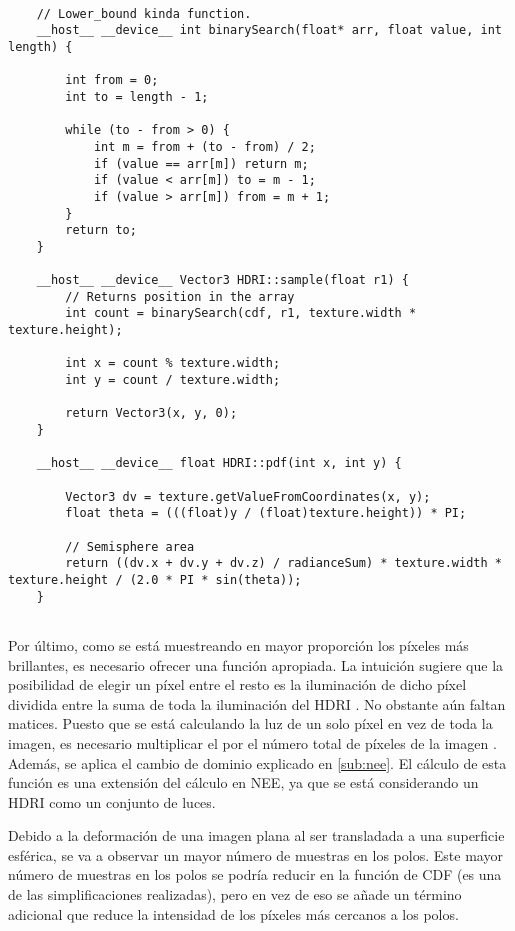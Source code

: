 \begin{lstlisting}
	
	// Lower_bound kinda function.
	__host__ __device__ int binarySearch(float* arr, float value, int length) {

		int from = 0;
		int to = length - 1;

		while (to - from > 0) {
			int m = from + (to - from) / 2;
			if (value == arr[m]) return m;
			if (value < arr[m])	to = m - 1;
			if (value > arr[m]) from = m + 1;
		}
		return to;
	}
	
	__host__ __device__ Vector3 HDRI::sample(float r1) {
		// Returns position in the array
		int count = binarySearch(cdf, r1, texture.width * texture.height);

		int x = count % texture.width;
		int y = count / texture.width;

		return Vector3(x, y, 0);
	}
	
	__host__ __device__ float HDRI::pdf(int x, int y) {

		Vector3 dv = texture.getValueFromCoordinates(x, y);
		float theta = (((float)y / (float)texture.height)) * PI;

		// Semisphere area
		return ((dv.x + dv.y + dv.z) / radianceSum) * texture.width * texture.height / (2.0 * PI * sin(theta));
	}
	
\end{lstlisting}

Por último, como se está muestreando en mayor proporción los píxeles más brillantes, es necesario ofrecer una función  apropiada. La intuición sugiere que la posibilidad de elegir un píxel entre el resto es la iluminación de dicho píxel dividida entre la suma de toda la iluminación del HDRI . No obstante aún faltan matices. Puesto que se está calculando la luz de un solo píxel en vez de toda la imagen, es necesario multiplicar el  por el número total de píxeles de la imagen . Además, se aplica el cambio de dominio explicado en \autoref{sub:nee}. El cálculo de esta función  es una extensión del cálculo en NEE, ya que se está considerando un HDRI como un conjunto de luces.

Debido a la deformación de una imagen plana al ser transladada a una superficie esférica, se va a observar un mayor número de muestras en los polos. Este mayor número de muestras en los polos se podría reducir en la función de CDF (es una de las simplificaciones realizadas), pero en vez de eso se añade un término adicional  que reduce la intensidad de los píxeles más cercanos a los polos.



